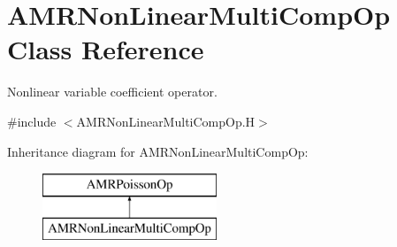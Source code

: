 \hypertarget{class_a_m_r_non_linear_multi_comp_op}{\section{A\-M\-R\-Non\-Linear\-Multi\-Comp\-Op Class Reference}
\label{class_a_m_r_non_linear_multi_comp_op}
}


Nonlinear variable coefficient operator.  




{\ttfamily \#include $<$A\-M\-R\-Non\-Linear\-Multi\-Comp\-Op.\-H$>$}

Inheritance diagram for A\-M\-R\-Non\-Linear\-Multi\-Comp\-Op\-:\begin{figure}[H]
\begin{center}
\leavevmode
\includegraphics[height=2.000000cm]{class_a_m_r_non_linear_multi_comp_op}
\end{center}
\end{figure}
